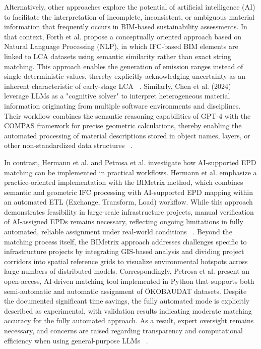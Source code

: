 \documentclass[10pt, a4paper, twocolumn]{article}
\begin{document}
Alternatively, other approaches explore the potential of artificial intelligence (AI) to facilitate the interpretation of incomplete, inconsistent, or ambiguous material information that frequently occurs in BIM-based sustainability assessments. In that context, Forth et al. propose a conceptually oriented approach based on Natural Language Processing (NLP), in which IFC-based BIM elements are linked to LCA datasets using semantic similarity rather than exact string matching. This approach enables the generation of emission ranges instead of single deterministic values, thereby explicitly acknowledging uncertainty as an inherent characteristic of early-stage LCA ~\cite{Forth.2023}. Similarly, Chen et al. (2024) leverage LLMs as a "cognitive solver" to interpret heterogeneous material information originating from multiple software environments and disciplines. Their workflow combines the semantic reasoning capabilities of GPT-4 with the COMPAS framework for precise geometric calculations, thereby enabling the automated processing of material descriptions stored in object names, layers, or other non-standardized data structures ~\cite{LiChenHeidiSilvennoinenCatherineDeWolfDanielHallTomVanMelePhilippeBlock.}.

In contrast, Hermann et al. and Petrosa et al. investigate how AI-supported EPD matching can be implemented in practical workflows. Hermann et al. emphasize a practice-oriented implementation with the BIMetrix method, which combines semantic and geometric IFC processing with AI-supported EPD mapping within an automated ETL (Exchange, Transform, Load) workflow. While this approach demonstrates feasibility in large-scale infrastructure projects, manual verification of AI-assigned EPDs remains necessary, reflecting ongoing limitations in fully automated, reliable assignment under real-world conditions ~\cite{Hermann.2024}. Beyond the matching process itself, the BIMetrix approach addresses challenges specific to infrastructure projects by integrating GIS-based analysis and dividing project corridors into spatial reference grids to visualize environmental hotspots across large numbers of distributed models. Correspondingly, Petrosa et al. present an open-access, AI-driven matching tool implemented in Python that supports both semi-automatic and automatic assignment of ÖKOBAUDAT datasets. Despite the documented significant time savings, the fully automated mode is explicitly described as experimental, with validation results indicating moderate matching accuracy for the fully automated approach. As a result, expert oversight remains necessary, and concerns are raised regarding transparency and computational efficiency when using general-purpose LLMs ~\cite{Petrosa.2025}.
\end{document}
